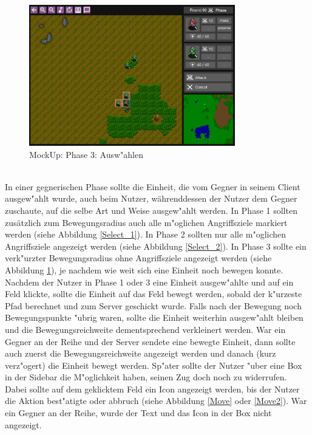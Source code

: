 \documentclass[12pt, titlepage]{scrartcl}
\newcounter{subsubsubsection}[subsubsection]
\begin{document}
			        \begin{figure}[H] 
    				    \centering
    				    \includegraphics[width=0.8\textwidth]{images/mockUps/Select3.png}
    				    \caption{MockUp: Phase 3: Ausw"ahlen}
    				    \label{Select_3}
			        \end{figure} 
		            \ \\ In einer gegnerischen Phase sollte die Einheit, die vom Gegner in seinem Client ausgew"ahlt wurde, auch beim Nutzer, w\"ahrenddessen der Nutzer dem Gegner zuschaute, auf die selbe Art und Weise ausgew"ahlt werden. In Phase 1 sollten zus\"atzlich zum Bewegungsradius auch alle m"oglichen Angriffsziele markiert werden (siehe Abbildung \ref{Select_1}). In Phase 2 sollten nur alle m"oglichen Angriffsziele angezeigt werden (siehe Abbildung \ref{Select_2}). In Phase 3 sollte ein verk"urzter Bewegungsradius ohne Angriffsziele angezeigt werden (siehe Abbildung \ref{Select_3}), je nachdem wie weit sich eine Einheit noch bewegen konnte.
                    Nachdem der Nutzer in Phase 1 oder 3 eine Einheit ausgew"ahlte und auf ein Feld klickte, sollte die Einheit auf das Feld bewegt werden, sobald der k"urzeste Pfad berechnet und zum Server geschickt wurde. Falls nach der Bewegung noch Bewegungspunkte "ubrig waren, sollte die Einheit weiterhin ausgew"ahlt bleiben und die Bewegungsreichweite dementsprechend verkleinert werden. War ein Gegner an der Reihe und der Server sendete eine bewegte Einheit, dann sollte auch zuerst die Bewegungsreichweite angezeigt werden und danach (kurz verz"ogert) die Einheit bewegt werden. Sp"ater sollte der Nutzer "uber eine Box in der Sidebar die M"oglichkeit haben, seinen Zug doch noch zu widerrufen. Dabei sollte auf dem geklicktem Feld ein Icon angezeigt werden, bis der Nutzer die Aktion best"atigte oder abbruch (siehe Abbildung \ref{Move} oder \ref{Move2}). War ein Gegner an der Reihe, wurde der Text und das Icon in der Box nicht angezeigt.
\end{document}
